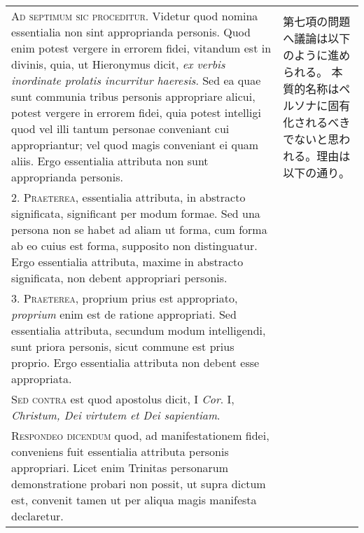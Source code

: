 \documentclass[10pt]{jsarticle} %
\begin{document}
\begin{longtable}{p{21em}p{21em}}

    \textsc{Ad septimum sic proceditur}. Videtur quod nomina essentialia non sint
    approprianda personis. Quod enim potest vergere in errorem fidei, vitandum
    est in divinis, quia, ut Hieronymus dicit, \textit{ex verbis inordinate prolatis
    incurritur haeresis}. Sed ea quae sunt communia tribus personis appropriare
    alicui, potest vergere in errorem fidei, quia potest intelligi quod vel
    illi tantum personae conveniant cui appropriantur; vel quod magis
    conveniant ei quam aliis. Ergo essentialia attributa non sunt approprianda
    personis.


&

第七項の問題へ議論は以下のように進められる。
本質的名称はペルソナに固有化されるべきでないと思われる。理由は以下の通り。

\\


2. \textsc{Praeterea}, essentialia attributa, in abstracto significata, significant per
modum formae. Sed una persona non se habet ad aliam ut forma, cum forma ab eo
cuius est forma, supposito non distinguatur. Ergo essentialia attributa, maxime
in abstracto significata, non debent appropriari personis.


&

\\


3. \textsc{Praeterea}, proprium prius est appropriato, \textit{proprium} enim est de ratione
appropriati. Sed essentialia attributa, secundum modum intelligendi, sunt
priora personis, sicut commune est prius proprio. Ergo essentialia attributa
non debent esse appropriata.


&

\\


\textsc{Sed contra} est quod apostolus dicit, I \textit{Cor}. I, \textit{Christum, Dei virtutem et Dei
sapientiam}.


&

\\


\textsc{Respondeo dicendum} quod, ad manifestationem fidei, conveniens fuit essentialia
attributa personis appropriari. Licet enim Trinitas personarum demonstratione
probari non possit, ut supra dictum est, convenit tamen ut per aliqua magis
manifesta declaretur. 



&


\end{longtable}
\end{document}
